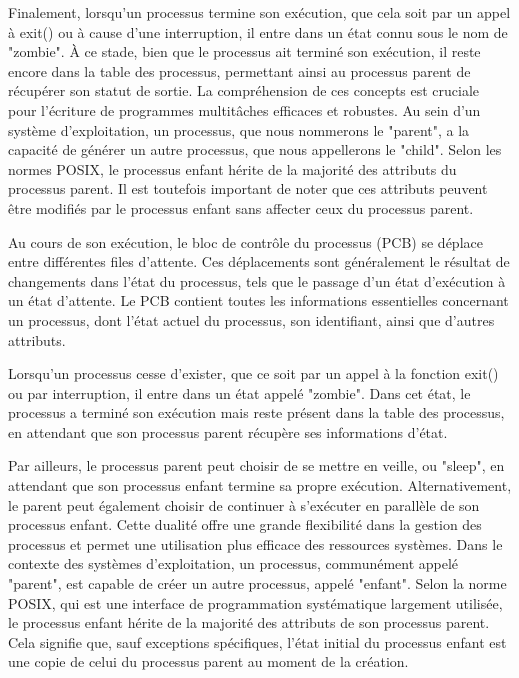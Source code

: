 \documentclass[12pt]{article}
\begin{document}
Finalement, lorsqu'un processus termine son exécution, que cela soit par un appel à exit() ou à cause d'une interruption, il entre dans un état connu sous le nom de "zombie". À ce stade, bien que le processus ait terminé son exécution, il reste encore dans la table des processus, permettant ainsi au processus parent de récupérer son statut de sortie. La compréhension de ces concepts est cruciale pour l'écriture de programmes multitâches efficaces et robustes.
Au sein d'un système d'exploitation, un processus, que nous nommerons le "parent", a la capacité de générer un autre processus, que nous appellerons le "child". Selon les normes POSIX, le processus enfant hérite de la majorité des attributs du processus parent. Il est toutefois important de noter que ces attributs peuvent être modifiés par le processus enfant sans affecter ceux du processus parent.

Au cours de son exécution, le bloc de contrôle du processus (PCB) se déplace entre différentes files d'attente. Ces déplacements sont généralement le résultat de changements dans l'état du processus, tels que le passage d'un état d'exécution à un état d'attente. Le PCB contient toutes les informations essentielles concernant un processus, dont l'état actuel du processus, son identifiant, ainsi que d'autres attributs.

Lorsqu'un processus cesse d'exister, que ce soit par un appel à la fonction exit() ou par interruption, il entre dans un état appelé "zombie". Dans cet état, le processus a terminé son exécution mais reste présent dans la table des processus, en attendant que son processus parent récupère ses informations d'état.

Par ailleurs, le processus parent peut choisir de se mettre en veille, ou "sleep", en attendant que son processus enfant termine sa propre exécution. Alternativement, le parent peut également choisir de continuer à s'exécuter en parallèle de son processus enfant. Cette dualité offre une grande flexibilité dans la gestion des processus et permet une utilisation plus efficace des ressources systèmes.
Dans le contexte des systèmes d'exploitation, un processus, communément appelé "parent", est capable de créer un autre processus, appelé "enfant". Selon la norme POSIX, qui est une interface de programmation systématique largement utilisée, le processus enfant hérite de la majorité des attributs de son processus parent. Cela signifie que, sauf exceptions spécifiques, l'état initial du processus enfant est une copie de celui du processus parent au moment de la création.
\end{document}
